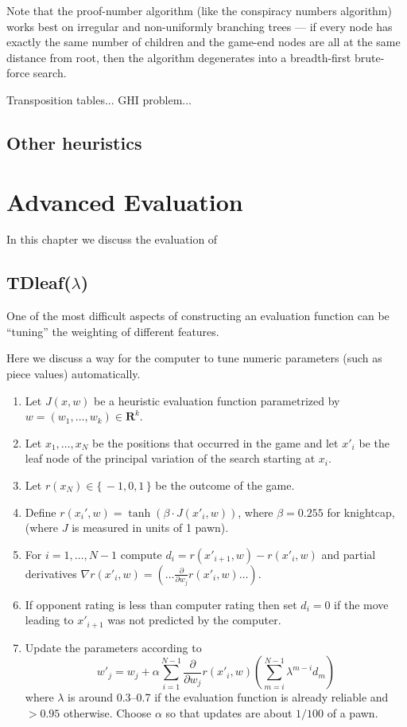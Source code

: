 \documentclass[10pt,dvipdfmx,letterpaper]{report}
\begin{document}
Note that the proof-number algorithm (like the conspiracy numbers algorithm) works best on irregular
and non-uniformly branching trees --- if every node has exactly the same number of children and the
game-end nodes are all at the same distance from root, then the algorithm degenerates into a breadth-first
brute-force search.  

Transposition tables... GHI problem...


\section{Other heuristics}

\chapter{Advanced Evaluation}
\label{chap-advanced-evaluation}

In this chapter we discuss the evaluation of

\section{TDleaf($\lambda$)}
One of the most difficult aspects of constructing an evaluation function
can be ``tuning'' the weighting of different features.

Here we discuss a way for the computer to tune numeric parameters
(such as piece values) automatically.

\begin{enumerate}
\item Let $J(x,w)$ be a heuristic evaluation function parametrized by
  $w=(w_1,\dots,w_k)\in\mathbf{R}^k$.
\item Let $x_1,\dots,x_N$ be the positions that occurred in the game and let
  $x'_i$ be the leaf node of the principal variation of the search starting
  at $x_i$.
\item Let $r(x_N)\in\{\,-1,0,1\,\}$ be the outcome of the game.
\item Define $r(x_i',w)=\tanh(\beta\cdot J(x'_i,w))$, where $\beta=0.255$ for
  knightcap, (where $J$ is measured in units of 1 pawn).
\item For $i=1,\dots,N-1$ compute $d_i = r(x'_{i+1},w) - r(x'_i,w)$ and partial
  derivatives $\nabla r(x'_i,w) = (\dots \frac{\partial}{\partial w_j}r(x'_i,w) \dots)$.
\item If opponent rating is less than computer rating then set $d_i=0$ if the move
  leading to $x'_{i+1}$ was not predicted by the computer.
\item Update the parameters according to 
  \[ w'_j = w_j + \alpha \sum_{i=1}^{N-1} \frac{\partial}{\partial w_j} r(x'_i,w)
    \left( \sum_{m=i}^{N-1}\lambda^{m-i}d_m \right) \]
  where $\lambda$ is around 0.3--0.7 if the evaluation function is already reliable
  and $>0.95$ otherwise.  Choose $\alpha$ so that updates are about $1/100$ of a pawn.
\end{enumerate}
\end{document}
